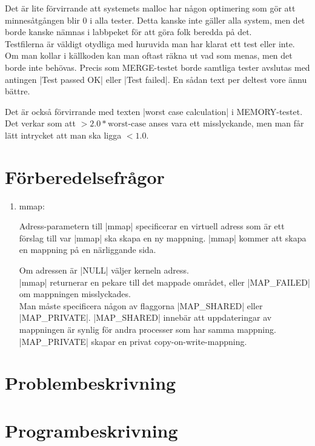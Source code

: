 \documentclass[paper=a4, fontsize=11pt]{scrartcl} %
\numberwithin{equation}{section} %
\numberwithin{figure}{section} %
\numberwithin{table}{section} %
\begin{document}
Det är lite förvirrande att systemets malloc har någon optimering som gör att minnesåtgången blir 0 i alla tester. 
Detta kanske inte gäller alla system, men det borde kanske nämnas i labbpeket för att göra folk beredda på det.\\

Testfilerna är väldigt otydliga med huruvida man har klarat ett test eller inte. Om man kollar i källkoden kan man
oftast räkna ut vad som menas, men det borde inte behövas.
Precis som MERGE-testet borde samtliga tester avslutas med antingen |Test passed OK| eller |Test failed|.
En sådan text per deltest vore ännu bättre. 

Det är också förvirrande med texten |worst case calculation| i MEMORY-testet. Det verkar som att $> 2.0*\text{worst-case}$ 
anses vara ett misslyckande, men man får lätt intrycket att man ska ligga $< 1.0$.


\section{Förberedelsefrågor}

\begin{enumerate}[1)]
\item{mmap:}

Adress-parametern till |mmap| specificerar en virtuell adress som är ett förslag till var |mmap| ska skapa en ny mappning.
|mmap| kommer att skapa en mappning på en närliggande sida.

Om adressen är |NULL| väljer kerneln adress.\\

|mmap| returnerar en pekare till det mappade området, eller |MAP_FAILED| om mappningen misslyckades.\\

Man måste specificera någon av flaggorna |MAP_SHARED| eller |MAP_PRIVATE|. |MAP_SHARED| innebär att
uppdateringar av mappningen är synlig för andra processer som har samma mappning. |MAP_PRIVATE| skapar en privat copy-on-write-mappning.
\end{enumerate}

\section{Problembeskrivning}


\section{Programbeskrivning}
\end{document}
